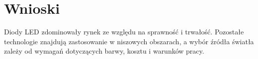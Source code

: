 \section*{Wnioski}
Diody LED zdominowały rynek ze względu na sprawność i trwałość. Pozostałe technologie znajdują zastosowanie w niszowych obszarach, a wybór źródła światła zależy od wymagań dotyczących barwy, kosztu i warunków pracy.